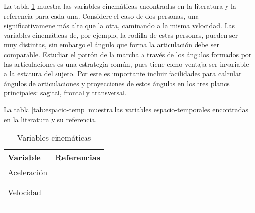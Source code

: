 La tabla \ref{tab:cinematicas} muestra las variables cinemáticas encontradas en la literatura y la referencia para cada una. Considere el caso de dos personas, una significativamene más alta que la otra, caminando a la misma velocidad. Las variables cinemáticas de, por ejemplo, la rodilla de estas personas, pueden ser muy distintas, sin embargo el ángulo que forma la articulación debe ser comparable. Estudiar el patrón de la marcha a través de los ángulos formados por las articulaciones es una estrategia común, pues tiene como ventaja ser invariable a la estatura del sujeto. Por este es importante incluir facilidades para calcular ángulos de articulaciones y proyecciones de estos ángulos en los tres planos principales: sagital, frontal y transversal.

La tabla \ref{tab:espacio-temp} muestra las variables espacio-temporales encontradas en la literatura y su referencia.

\begin{table}
    \centering
    \caption{Variables cinemáticas}
    \label{tab:cinematicas}
    \begin{tabular}{ll}
        \toprule
        Variable & Referencias \\
        \midrule
        Aceleración & \cite{yang, menz, dejnabadi} \\
                    & \cite{arif, senanayake, latt} \\
                    & \cite{punt, mazza}      \\
        Velocidad   & \cite{yang, menz, cuaya} \\
                    & \cite{franklin, forneris, muro} \\
                    & \cite{lei, prakash, latt} \\
                    & \cite{punt, mazza, bruijn} \\
        \bottomrule
    \end{tabular}
\end{table}

